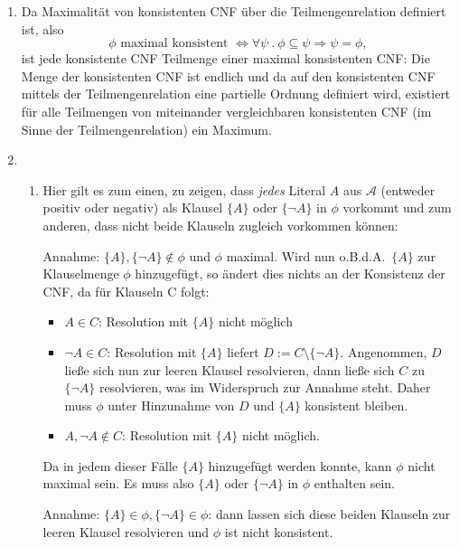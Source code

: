 \begin{enumerate}
    \item Da Maximalität von konsistenten CNF über die Teilmengenrelation definiert ist, also 
          \[
            \phi \text{ maximal konsistent } \Leftrightarrow \forall \psi\ .\ \phi \subseteq \psi \Rightarrow \psi = \phi,
          \]
          ist jede konsistente CNF Teilmenge einer maximal konsistenten CNF: Die Menge der konsistenten CNF ist
          endlich und da auf den konsistenten CNF mittels der Teilmengenrelation eine partielle Ordnung definiert
          wird, existiert für alle Teilmengen von miteinander vergleichbaren konsistenten CNF (im Sinne der
          Teilmengenrelation) ein Maximum.
    \item
        \begin{enumerate}
                \item Hier gilt es zum einen, zu zeigen, dass \emph{jedes} Literal $A$ aus $\mathcal{A}$ (entweder
                positiv oder negativ) als Klausel $\{A\}$ oder $\{\neg A\}$ in $\phi$ vorkommt und zum anderen, dass
                nicht beide Klauseln zugleich vorkommen können:

                Annahme: $\{A\}, \{\neg A\} \not\in \phi$ und $\phi$ maximal. Wird nun o.B.d.A.\ $\{A\}$ zur
                Klauselmenge $\phi$ hinzugefügt, so ändert dies nichts an der Konsistenz der CNF, da für Klauseln C
                folgt:
                \begin{itemize}
                        \item[]$A \in C$: Resolution mit $\{A\}$ nicht möglich
                        \item[]$\neg A \in C$: Resolution mit $\{A\}$ liefert $D := C \setminus \{\neg A\}$.
                                Angenommen, $D$ ließe sich nun zur leeren Klausel resolvieren, dann ließe sich $C$ zu
                                $\{\neg A\}$ resolvieren, was im Widerspruch zur Annahme steht. Daher muss $\phi$ unter
                                Hinzunahme von $D$ und $\{A\}$ konsistent bleiben.
                        \item[]$A, \neg A \not \in C$: Resolution mit $\{A\}$ nicht möglich.
                \end{itemize}
                Da in jedem dieser Fälle $\{A\}$ hinzugefügt werden konnte, kann $\phi$ nicht maximal sein. Es muss
                also $\{A\}$ oder $\{\neg A\}$ in $\phi$ enthalten sein.

                Annahme: $\{A\} \in \phi, \{\neg A\} \in \phi$: dann lassen sich diese beiden Klauseln zur leeren
                Klausel resolvieren und $\phi$ ist nicht konsistent.


\end{enumerate}
\end{enumerate}
